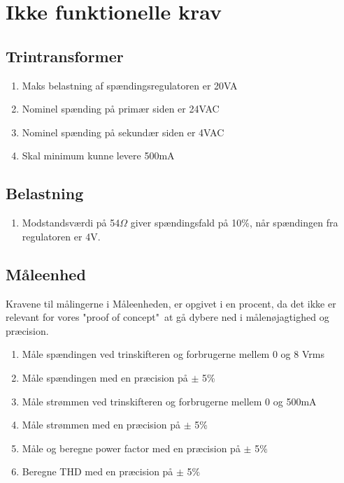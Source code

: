 
\section{Ikke funktionelle krav}

\subsection{Trintransformer}
\begin{enumerate}
	\item Maks belastning af spændingsregulatoren er 20VA
	\item Nominel spænding på primær siden er 24VAC
	\item Nominel spænding på sekundær siden er 4VAC
	\item Skal minimum kunne levere 500mA	
\end{enumerate}

\subsection{Belastning}
\begin{enumerate}
	\item Modstandsværdi på 54$\Omega$ giver spændingsfald på 10\%, når spændingen fra regulatoren er 4V.
\end{enumerate}

\subsection{Måleenhed}
\label{subsec:ME}
Kravene til målingerne i Måleenheden, er opgivet i en procent, da det ikke er relevant for vores "proof of concept"\  at gå dybere ned i målenøjagtighed og præcision. 
\begin{enumerate}
	\item Måle spændingen ved trinskifteren og forbrugerne mellem 0 og 8 Vrms
	\item Måle spændingen med en præcision på $\pm$ 5\%
	\item Måle strømmen ved trinskifteren og forbrugerne mellem 0 og 500mA
	\item Måle strømmen med en præcision på $\pm$ 5\%
	\item Måle og beregne power factor med en præcision på $\pm$ 5$\%$
	\item Beregne THD med en præcision på $\pm$ 5$\%$
\end{enumerate}


